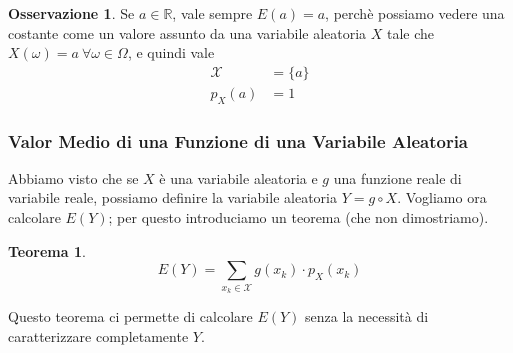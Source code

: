 \documentclass{article}
\theoremstyle{plain}
\newtheorem{teorema}{Teorema}[section]
\theoremstyle{definition}
\newtheorem{osservazione}{Osservazione}[section]
\theoremstyle{remark}
\begin{document}
\begin{osservazione}
	Se $a\in\mathds{R}$, vale sempre $E(a)=a$, perchè possiamo vedere una costante come un valore assunto da una variabile aleatoria $X$ tale che $X(\omega)=a\ \forall\omega\in\Omega$, e quindi vale
	\begin{align*}
		\mathcal{X}&=\{a\}\\
		p_X(a)&=1
	\end{align*}
\end{osservazione}
\subsubsection{Valor Medio di una Funzione di una Variabile Aleatoria} %
\label{ssub:valor_medio_di_una_funzione_di_una_variabile_aleatoria}
Abbiamo visto che se $X$ è una variabile aleatoria e $g$ una funzione reale di variabile reale, possiamo definire la variabile aleatoria $Y=g\circ X$. Vogliamo ora calcolare $E(Y)$; per questo introduciamo un teorema (che non dimostriamo).
\begin{teorema}
	\begin{equation*}
		E(Y)=\sum_{x_k\in\mathcal{X}} g(x_k)\cdot p_X(x_k)
	\end{equation*}
\end{teorema}
Questo teorema ci permette di calcolare $E(Y)$ senza la necessità di caratterizzare completamente $Y$.
\end{document}
